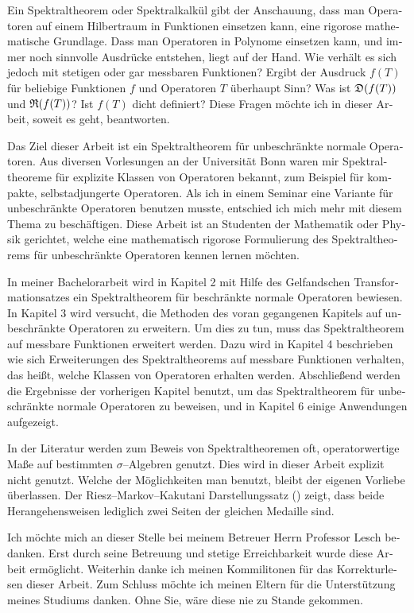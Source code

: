 \vspace{.35cm}

\noindent
\begin{otherlanguage}{ngerman}
Ein Spektraltheorem oder Spektralkalkül gibt der Anschauung, dass man 
Operatoren auf einem Hilbertraum in Funktionen einsetzen kann, eine 
rigorose mathematische Grundlage.
Dass man Operatoren in Polynome einsetzen kann, und immer noch sinnvolle
Ausdrücke entstehen, liegt auf der Hand. Wie verhält es sich jedoch mit
stetigen oder gar messbaren Funktionen? Ergibt der Ausdruck $f(T)$ für
beliebige Funktionen $f$ und Operatoren $T$ überhaupt Sinn? Was ist 
$\mathfrak{D}(f(T))$ und $\mathfrak{R}(f(T))$? Ist $f(T)$ dicht definiert?
Diese Fragen möchte ich in dieser Arbeit, soweit es geht, beantworten.

Das Ziel dieser Arbeit ist ein Spektraltheorem für unbeschränkte normale 
Operatoren. Aus diversen Vorlesungen an der Universität Bonn waren mir
Spektraltheoreme für explizite Klassen von Operatoren bekannt, zum 
Beispiel für kompakte, selbstadjungerte Operatoren. Als ich in einem Seminar
eine Variante für unbeschränkte Operatoren benutzen musste, entschied ich
mich mehr mit diesem Thema zu beschäftigen. Diese Arbeit
ist an Studenten der Mathematik oder Physik gerichtet, welche eine 
mathematisch rigorose Formulierung des Spektraltheorems
für unbeschränkte Operatoren kennen lernen möchten.

In meiner Bachelorarbeit wird in Kapitel 2 mit Hilfe des Gelfandschen 
Transformationsatzes ein Spektraltheorem für beschränkte normale Operatoren 
bewiesen. In Kapitel 3 wird versucht, die Methoden des voran gegangenen Kapitels
auf unbeschränkte Operatoren zu erweitern. Um dies zu tun, muss das 
Spektraltheorem auf messbare Funktionen erweitert werden.
Dazu wird in Kapitel 4 beschrieben wie sich Erweiterungen des 
Spektraltheorems auf messbare Funktionen verhalten, das heißt, welche Klassen
von Operatoren erhalten werden. Abschließend werden die Ergebnisse der 
vorherigen Kapitel benutzt, um das Spektraltheorem für unbeschränkte normale
Operatoren zu beweisen, und in Kapitel 6 einige Anwendungen aufgezeigt.

In der Literatur werden zum Beweis von Spektraltheoremen oft, operatorwertige
Maße auf bestimmten $\sigma$--Algebren genutzt.
Dies wird in dieser Arbeit explizit nicht genutzt. Welche der Möglichkeiten
man benutzt, bleibt der eigenen Vorliebe überlassen. Der Riesz--Markov--Kakutani
Darstellungssatz (\cite[Theorem 6.3.4]{PedAnaN})
zeigt, dass beide Herangehensweisen
lediglich zwei Seiten der gleichen Medaille sind. 

Ich möchte mich an dieser Stelle bei meinem Betreuer Herrn Professor Lesch bedanken.
Erst durch seine Betreuung und stetige Erreichbarkeit wurde diese Arbeit ermöglicht.
Weiterhin danke ich meinen Kommilitonen für das Korrekturlesen dieser Arbeit. 
Zum Schluss möchte ich meinen Eltern für die Unterstützung meines Studiums danken.
Ohne Sie, wäre diese nie zu Stande gekommen.


\end{otherlanguage}